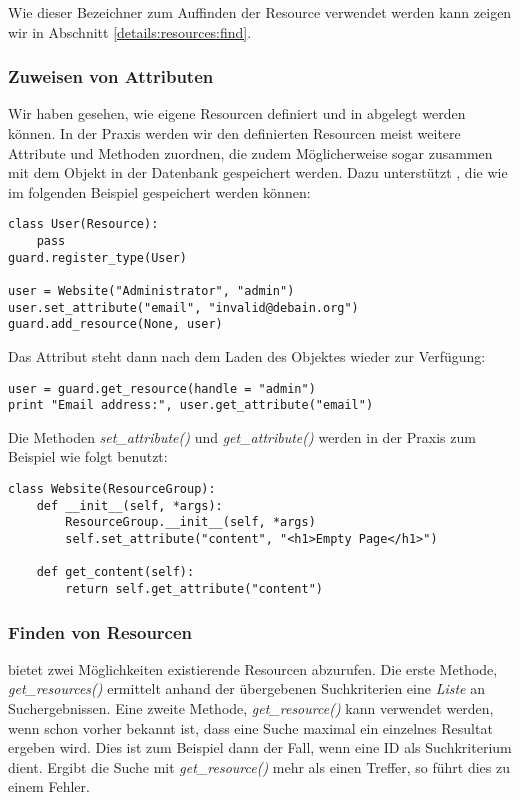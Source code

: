 Wie dieser Bezeichner zum Auffinden der Resource verwendet werden kann 
zeigen wir in Abschnitt \ref{details:resources:find}.


\subsubsection{\label{details:resources:attributes}Zuweisen von Attributen}

Wir haben gesehen, wie eigene Resourcen definiert und in \product abgelegt 
werden können. In der Praxis werden wir den definierten Resourcen meist 
weitere Attribute und Methoden zuordnen, die zudem Möglicherweise sogar 
zusammen mit dem Objekt in der Datenbank gespeichert werden. Dazu 
unterstützt , die wie im folgenden Beispiel 
gespeichert werden können:

\begin{lstlisting}
class User(Resource):
    pass
guard.register_type(User)

user = Website("Administrator", "admin")
user.set_attribute("email", "invalid@debain.org")
guard.add_resource(None, user)
\end{lstlisting}

Das Attribut steht dann nach dem Laden des Objektes wieder zur Verfügung:

\begin{lstlisting}
user = guard.get_resource(handle = "admin")
print "Email address:", user.get_attribute("email")
\end{lstlisting}

Die Methoden {\it set\_attribute()} und {\it get\_attribute()} werden in der 
Praxis zum Beispiel wie folgt benutzt:

\begin{lstlisting}
class Website(ResourceGroup):
    def __init__(self, *args):
        ResourceGroup.__init__(self, *args)
        self.set_attribute("content", "<h1>Empty Page</h1>")

    def get_content(self):
        return self.get_attribute("content")
\end{lstlisting}


\subsubsection{\label{details:resources:find}Finden von Resourcen}

\product bietet zwei Möglichkeiten existierende Resourcen 
abzurufen. Die erste Methode, {\it get\_resources()} ermittelt anhand der 
übergebenen Suchkriterien eine {\it Liste} an Suchergebnissen.
Eine zweite Methode, {\it get\_resource()} kann verwendet werden, wenn 
schon vorher bekannt ist, dass eine Suche maximal ein einzelnes Resultat 
ergeben wird. Dies ist zum Beispiel dann der Fall, wenn eine ID als 
Suchkriterium dient. Ergibt die Suche mit {\it get\_resource()} mehr als 
einen Treffer, so führt dies zu einem Fehler.

